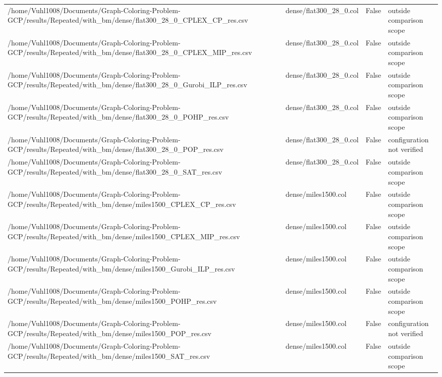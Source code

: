 \begin{table}[htbp]
\begin{tabular}{llll}
/home/Vuhl1008/Documents/Graph-Coloring-Problem-GCP/results/Repeated/with\_bm/dense/flat300\_28\_0\_CPLEX\_CP\_res.csv & dense/flat300\_28\_0.col & False & outside comparison scope \\
/home/Vuhl1008/Documents/Graph-Coloring-Problem-GCP/results/Repeated/with\_bm/dense/flat300\_28\_0\_CPLEX\_MIP\_res.csv & dense/flat300\_28\_0.col & False & outside comparison scope \\
/home/Vuhl1008/Documents/Graph-Coloring-Problem-GCP/results/Repeated/with\_bm/dense/flat300\_28\_0\_Gurobi\_ILP\_res.csv & dense/flat300\_28\_0.col & False & outside comparison scope \\
/home/Vuhl1008/Documents/Graph-Coloring-Problem-GCP/results/Repeated/with\_bm/dense/flat300\_28\_0\_POHP\_res.csv & dense/flat300\_28\_0.col & False & outside comparison scope \\
/home/Vuhl1008/Documents/Graph-Coloring-Problem-GCP/results/Repeated/with\_bm/dense/flat300\_28\_0\_POP\_res.csv & dense/flat300\_28\_0.col & False & configuration not verified \\
/home/Vuhl1008/Documents/Graph-Coloring-Problem-GCP/results/Repeated/with\_bm/dense/flat300\_28\_0\_SAT\_res.csv & dense/flat300\_28\_0.col & False & outside comparison scope \\
/home/Vuhl1008/Documents/Graph-Coloring-Problem-GCP/results/Repeated/with\_bm/dense/miles1500\_CPLEX\_CP\_res.csv & dense/miles1500.col & False & outside comparison scope \\
/home/Vuhl1008/Documents/Graph-Coloring-Problem-GCP/results/Repeated/with\_bm/dense/miles1500\_CPLEX\_MIP\_res.csv & dense/miles1500.col & False & outside comparison scope \\
/home/Vuhl1008/Documents/Graph-Coloring-Problem-GCP/results/Repeated/with\_bm/dense/miles1500\_Gurobi\_ILP\_res.csv & dense/miles1500.col & False & outside comparison scope \\
/home/Vuhl1008/Documents/Graph-Coloring-Problem-GCP/results/Repeated/with\_bm/dense/miles1500\_POHP\_res.csv & dense/miles1500.col & False & outside comparison scope \\
/home/Vuhl1008/Documents/Graph-Coloring-Problem-GCP/results/Repeated/with\_bm/dense/miles1500\_POP\_res.csv & dense/miles1500.col & False & configuration not verified \\
/home/Vuhl1008/Documents/Graph-Coloring-Problem-GCP/results/Repeated/with\_bm/dense/miles1500\_SAT\_res.csv & dense/miles1500.col & False & outside comparison scope \\

\end{tabular}
\end{table}
